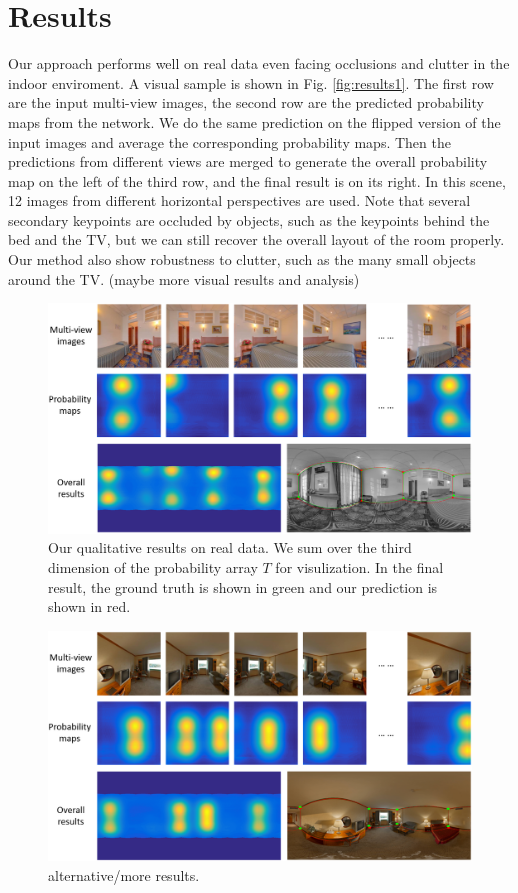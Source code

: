 

\section{Results}
Our approach performs well on real data even facing occlusions and clutter in the indoor enviroment. A visual sample is shown in Fig. \ref{fig:results1}. The first row are the input multi-view images, the second row are the predicted probability maps from the network. We do the same prediction on the flipped version of the input images and average the corresponding probability maps. Then the predictions from different views are merged to generate the overall probability map on the left of the third row, and the final result is on its right. In this scene, 12 images from different horizontal perspectives are used. Note that several secondary keypoints are occluded by objects, such as the keypoints behind the bed and the TV, but we can still recover the overall layout of the room properly. Our method also show robustness to clutter, such as the many small objects around the TV. (maybe more visual results and analysis)

\begin{figure}[ht]
	\centering
	\includegraphics[width=\linewidth]{figs/results2.png}
	\caption{Our qualitative results on real data. We sum over the third dimension of the probability array $T$ for visulization. In the final result, the ground truth is shown in green and our prediction is shown in red. }
	\label{fig:results2}
\end{figure}

\begin{figure}
	\centering
	\includegraphics[width=\linewidth]{figs/results3.png}
	\caption{alternative/more results. }
	\label{fig:results3}
\end{figure}

